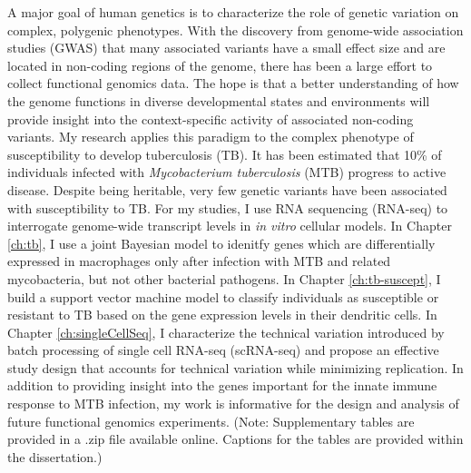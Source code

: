 \abstract
A major goal of human genetics is to characterize the role of genetic
variation on complex, polygenic phenotypes. With the discovery from
genome-wide association studies (GWAS) that many associated variants
have a small effect size and are located in non-coding regions of the
genome, there has been a large effort to collect functional genomics
data. The hope is that a better understanding of how the genome
functions in diverse developmental states and environments will
provide insight into the context-specific activity of associated
non-coding variants. My research applies this paradigm to the complex
phenotype of susceptibility to develop tuberculosis (TB). It has been
estimated that 10\% of individuals infected with \emph{Mycobacterium
tuberculosis} (MTB) progress to active disease. Despite being
heritable, very few genetic variants have been associated with
susceptibility to TB. For my studies, I use RNA sequencing (RNA-seq)
to interrogate genome-wide transcript levels in \emph{in vitro}
cellular models. In Chapter \ref{ch:tb}, I use a joint Bayesian model
to idenitfy genes which are differentially expressed in macrophages
only after infection with MTB and related mycobacteria, but not other
bacterial pathogens. In Chapter \ref{ch:tb-suscept}, I build a support
vector machine model to classify individuals as susceptible or
resistant to TB based on the gene expression levels in their dendritic
cells. In Chapter \ref{ch:singleCellSeq}, I characterize the technical
variation introduced by batch processing of single cell RNA-seq
(scRNA-seq) and propose an effective study design that accounts for
technical variation while minimizing replication.  In addition to
providing insight into the genes important for the innate immune
response to MTB infection, my work is informative for the design and
analysis of future functional genomics experiments.
(Note: Supplementary tables are provided in a .zip file available
online. Captions for the tables are provided within the dissertation.)
